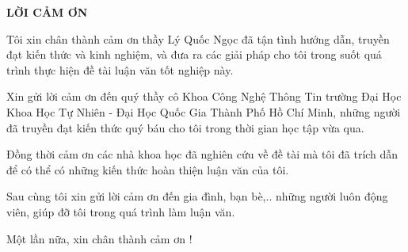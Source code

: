 \vspace{2cm}
	
{}

{\MakeUppercase\centering\Large\bfseries LỜI CẢM ƠN}


\vspace{2cm}
{

Tôi xin chân thành cảm ơn thầy Lý Quốc Ngọc đã tận tình hướng dẫn, truyền đạt kiến thức và kinh nghiệm, và đưa ra các giải pháp cho tôi trong suốt quá trình thực hiện đề tài luận văn tốt nghiệp này.

Xin gửi lời cảm ơn đến quý thầy cô Khoa Công Nghệ Thông Tin trường Đại Học Khoa Học Tự Nhiên - Đại Học Quốc Gia Thành Phố Hồ Chí Minh, những người đã truyền đạt kiến thức quý báu cho tôi trong thời gian học tập vừa qua.

Đồng thời cảm ơn các nhà khoa học đã nghiên cứu về đề tài mà tôi đã trích dẫn để có thể có những kiến thức hoàn thiện luận văn của tôi.

Sau cùng tôi xin gửi lời cảm ơn đến gia đình, bạn bè,.. những người luôn động viên, giúp đỡ tôi trong quá trình làm luận văn. 

Một lần nữa, xin chân thành cảm ơn !
}

\pagebreak

